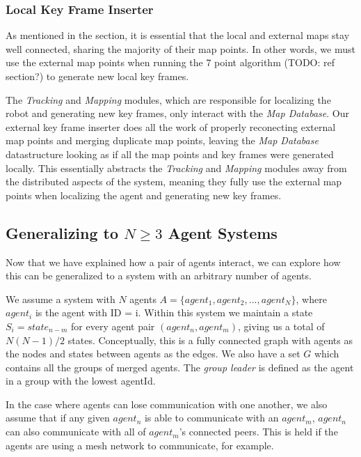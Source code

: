 \subsubsection{Local Key Frame Inserter}
\label{sec:local-key-frame-inserter}
As mentioned in the  section, it is essential that the local and external maps stay well connected, sharing the majority of their map points. In other words, we must use the external map points when running the 7 point algorithm (TODO: ref section?) to generate new local key frames.

The \textit{Tracking} and \textit{Mapping} modules, which are responsible for localizing the robot and generating new key frames, only interact with the \textit{Map Database}. Our external key frame inserter does all the work of properly reconecting external map points and merging duplicate map points, leaving the \textit{Map Database} datastructure looking as if all the map points and key frames were generated locally. This essentially abstracts the \textit{Tracking} and \textit{Mapping} modules away from the distributed aspects of the system, meaning they fully use the external map points when localizing the agent and generating new key frames.

\subsection{Generalizing to $N \geq 3$ Agent Systems}
\label{sec:generalizing-to-n-geq-3-agent-systems}
Now that we have explained how a pair of agents interact, we can explore how this can be generalized to a system with an arbitrary number of agents.

We assume a system with $N$ agents $A=\{agent_1, agent_2, ..., agent_N\}$, where $agent_i$ is the agent with ID = i. Within this system we maintain a state $S_i=state_{n-m}$ for every agent pair $(agent_n, agent_m)$, giving us a total of $N(N-1)/2$ states. Conceptually, this is a fully connected graph with agents as the nodes and states between agents as the edges. We also have a set $G$ which contains all the groups of merged agents. The \textit{group leader} is defined as the agent in a group with the lowest agentId.

In the case where agents can lose communication with one another, we also assume that if any given $agent_n$ is able to communicate with an $agent_m$, $agent_n$ can also communicate with all of $agent_m$'s connected peers. This is held if the agents are using a mesh network to communicate, for example.

